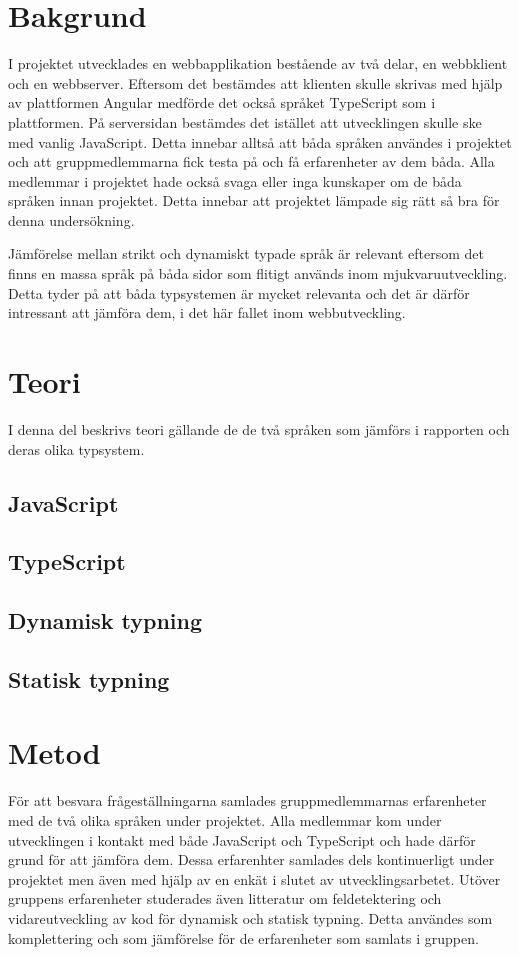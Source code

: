 \section{Bakgrund}
I projektet utvecklades en webbapplikation bestående av två delar, en webbklient och en webbserver. Eftersom det bestämdes att klienten skulle skrivas med hjälp av plattformen Angular medförde det också språket TypeScript som i plattformen. På serversidan bestämdes det istället att utvecklingen skulle ske med vanlig JavaScript. Detta innebar alltså att båda språken användes i projektet och att gruppmedlemmarna fick testa på och få erfarenheter av dem båda. Alla medlemmar i projektet hade också svaga eller inga kunskaper om de båda språken innan projektet. Detta innebar att projektet lämpade sig rätt så bra för denna undersökning.

Jämförelse mellan strikt och dynamiskt typade språk är relevant eftersom det finns en massa språk på båda sidor som flitigt används inom mjukvaruutveckling. Detta tyder på att båda typsystemen är mycket relevanta och det är därför intressant att jämföra dem, i det här fallet inom webbutveckling.
\section{Teori}
I denna del beskrivs teori gällande de de två språken som jämförs i rapporten och deras olika typsystem.
\subsection{JavaScript}
\subsection{TypeScript}
\subsection{Dynamisk typning}
\subsection{Statisk typning}
\section{Metod}
För att besvara frågeställningarna samlades gruppmedlemmarnas erfarenheter med de två olika språken under projektet. Alla medlemmar kom under utvecklingen i kontakt med både JavaScript och TypeScript och hade därför grund för att jämföra dem. Dessa erfarenhter samlades dels kontinuerligt under projektet men även med hjälp av en enkät i slutet av utvecklingsarbetet. Utöver gruppens erfarenheter studerades även litteratur om feldetektering och vidareutveckling av kod för dynamisk och statisk typning. Detta användes som komplettering och som jämförelse för de erfarenheter som samlats i gruppen.
